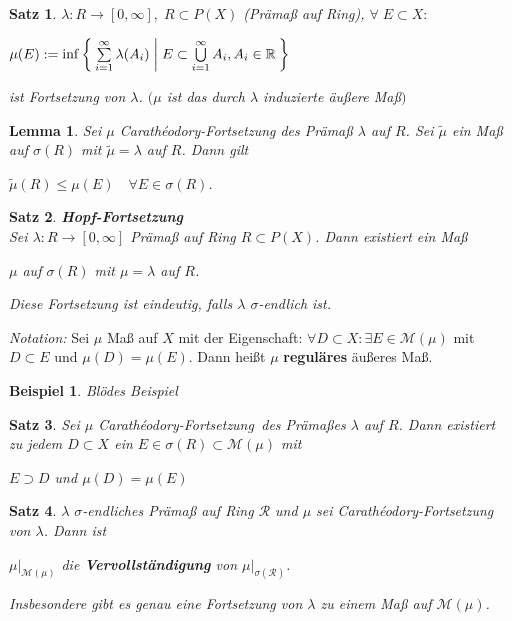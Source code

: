 \documentclass[11pt]{memoir}
\theoremstyle{changebreak}
\newtheorem{Beispiel}{Beispiel}[chapter]
\newtheorem{Lemma}{Lemma}[chapter]
\newtheorem{Satz}{Satz}[chapter]
\newcommand{\cara}{Carathéodory-Fortsetzung}
\begin{document}
\begin{Satz}
$\lambda: R \rightarrow [0, \infty], \;R \subset P(X)$ (Prämaß auf Ring), $\forall \;E \subset X:$ \\
\begin{center}
$\mu(E):= \inf\Set{ \sum\limits_{i=1}^{\infty} \lambda(A_i) | E \subset \bigcup\limits_{i=1}^{\infty} A_i, A_i \in \mathbb{R}}$
\end{center}
ist Fortsetzung von $\lambda$. $(\mu$ ist das durch $\lambda$ induzierte äußere Maß$)$
\end{Satz}

\begin{Lemma}
Sei $\mu$ \cara\; des Prämaß $\lambda$ auf $R$. Sei $\tilde{\mu}$ ein Maß auf $\sigma(R)$ mit $\tilde{\mu} = \lambda$ auf $R$. Dann gilt 
\begin{center}
	$\tilde{\mu}(R) \leq \mu(E)\quad \forall E \in \sigma(R)$.
\end{center}
\end{Lemma}

\begin{Satz} \emph{\textbf{Hopf-Fortsetzung} }\\
Sei $\lambda: R \rightarrow [0, \infty]$ Prämaß auf Ring $R \subset P(X)$. Dann existiert ein Maß 
\begin{center}
	$\mu$ auf $\sigma(R)$ mit $\mu =\lambda$ auf $R$.
\end{center}	
Diese Fortsetzung ist \emph{eindeutig}, falls $\lambda$ $\sigma$-endlich ist.
\end{Satz}

\emph{Notation:}
Sei $\mu$ Maß auf $X$ mit der Eigenschaft: $\forall D \subset X: \exists E \in \mathscr{M}(\mu)$ mit $D \subset E$ und $\mu(D) = \mu(E)$. Dann heißt $\mu$ \textbf{reguläres} äußeres Maß.

\begin{Beispiel}
Blödes Beispiel
\end{Beispiel}

\begin{Satz}
Sei $\mu$ \cara\, des Prämaßes $\lambda$ auf $R$. Dann existiert zu jedem $D \subset X$ ein $E \in \sigma(R) \subset \mathscr M(\mu)$ mit 
\begin{center}
	$E \supset D$ \quad und \quad $\mu(D) = \mu(E)$
\end{center}
\end{Satz}

\begin{Satz}
$\lambda$  $\sigma$-endliches Prämaß auf Ring $\mathscr R$ und $\mu$ sei \cara\; von $\lambda$. Dann ist 
\begin{center}
	$\mu|_{\mathscr M(\mu)}$ die \textbf{Vervollständigung} von $\mu|_{\sigma(\mathscr R)}$. 
\end{center}
Insbesondere gibt es genau eine Fortsetzung von $\lambda$ zu einem Maß auf $\mathscr M(\mu)$.
\end{Satz}
\end{document}
